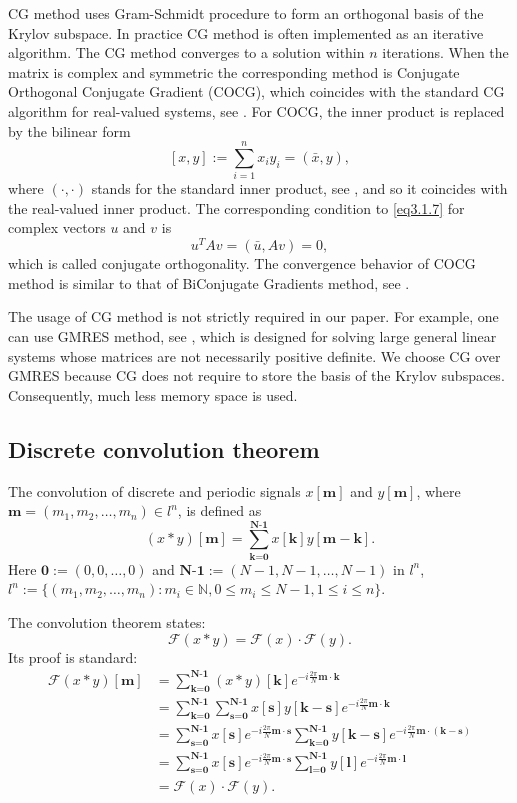 \documentclass[12pt]{elsarticle}
\numberwithin{equation}{section}
\newcommand{\N}{{\mathbb N}}
\newcommand{\be}{\begin{equation}}
\newcommand{\ee}{\end{equation}}
\begin{document}
CG method uses Gram-Schmidt procedure to form an orthogonal basis of the Krylov subspace. In practice CG method is often implemented as an iterative algorithm. The CG method converges to a solution within $n$ iterations. When the matrix is complex and symmetric the corresponding method is Conjugate Orthogonal Conjugate Gradient (COCG), which coincides with the standard CG algorithm for real-valued systems, see \cite{Clemens}. For COCG, the inner product is replaced by the bilinear form
\be \label{eq3.1.14}
	[x,y]:=\sum_{i=1}^{n}x_iy_i=(\bar{x},y),
\ee
where $(\cdot,\cdot)$ stands for the standard inner product, see \cite{COCG}, and so it coincides with the real-valued inner product. The corresponding condition to \eqref{eq3.1.7} for complex vectors $u$ and $v$ is
\be \label{eq3.1.15}
	u^T Av=(\bar{u},Av)=0,
\ee
which is called conjugate orthogonality. The convergence behavior of COCG method is similar to that of BiConjugate Gradients method, see \cite{COCG}.

The usage of CG method is not strictly required in our paper. For example, one can use GMRES method, see \cite{GMRES}, which is
designed for solving large general linear systems whose matrices are not necessarily positive definite. We choose CG over GMRES  because CG does not  require to
store the basis of the Krylov subspaces. Consequently,  much less memory space is used.

\subsection{Discrete convolution theorem} \label{sec3.2}
The convolution of discrete and periodic signals $x[\textbf{m}]$ and $y[\textbf{m}]$, where  $\textbf{m}=(m_1,m_2,\ldots,m_n) \in l^n$, is defined as
\be
	(x * y)[\textbf{m}]=\sum_{\textbf{k}=\textbf{0}}^{\textbf{N-1}} x[\textbf{k}]y[\textbf{m}-\textbf{k}].
\ee
Here $\textbf{0}:=(0,0,\ldots,0)$ and $\textbf{N-1}:=(N-1,N-1,\ldots,N-1)$ in $l^n$, $l^n:=\{(m_1,m_2,\ldots,m_n): m_i \in \N, 0 \le m_i \le N-1, 1 \le i \le n\}$.

The convolution theorem states:
\be
	\mathcal{F}(x*y)=\mathcal{F}(x)\cdot \mathcal{F}(y).
\ee
Its proof is standard:
\begin{align}
	\mathcal{F}(x*y)[\textbf{m}]
	&=\sum_{\textbf{k}=\textbf{0}}^{\textbf{N-1}}(x*y)[\textbf{k}]  e^{-i\frac{2\pi}{N}\textbf{m}\cdot\textbf{k}} \\
	&=\sum_{\textbf{k}=\textbf{0}}^{\textbf{N-1}} \sum_{\textbf{s}=\textbf{0}}^{\textbf{N-1}} x[\textbf{s}]y[\textbf{k}-\textbf{s}]  e^{-i\frac{2\pi}{N}\textbf{m}\cdot\textbf{k}} \\
	&= \sum_{\textbf{s}=\textbf{0}}^{\textbf{N-1}} x[\textbf{s}] e^{-i\frac{2\pi}{N}\textbf{m}\cdot\textbf{s}} \sum_{\textbf{k}=\textbf{0}}^{\textbf{N-1}} y[\textbf{k}-\textbf{s}]  e^{-i\frac{2\pi}{N}\textbf{m}\cdot(\textbf{k}-\textbf{s})} \\
	&= \sum_{\textbf{s}=\textbf{0}}^{\textbf{N-1}} x[\textbf{s}] e^{-i\frac{2\pi}{N}\textbf{m}\cdot\textbf{s}} \sum_{\textbf{l}=\textbf{0}}^{\textbf{N-1}} y[\textbf{l}]  e^{-i\frac{2\pi}{N}\textbf{m}\cdot\textbf{l}} \\
	&= \mathcal{F}(x)\cdot \mathcal{F}(y).
\end{align}	
\end{document}
